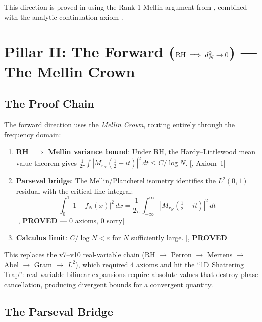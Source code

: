\documentclass[11pt,a4paper]{article}
\begin{document}
This direction is proved in  using
the Rank-1 Mellin argument from , combined with the
analytic continuation axiom .

\section{Pillar II: The Forward ($\mathrm{RH} \implies d_N^2 \to 0$) --- The Mellin Crown}

\subsection{The Proof Chain}

The forward direction uses the \emph{Mellin Crown}, routing entirely through
the frequency domain:

\begin{enumerate}
  \item \textbf{RH $\implies$ Mellin variance bound}: Under RH, the
    Hardy--Littlewood mean value theorem gives
    $\frac{1}{2\pi}\int |M_{r_N}(\frac{1}{2}+it)|^2\,dt \le C/\log N$.
    [, Axiom~1]

  \item \textbf{Parseval bridge}: The Mellin/Plancherel isometry identifies
    the $L^2(0,1)$ residual with the critical-line integral:
    \[
      \int_0^1 |1 - f_N(x)|^2\,dx
      = \frac{1}{2\pi} \int_{-\infty}^{\infty}
        |M_{r_N}(\tfrac{1}{2}+it)|^2\,dt
    \]
    [, \textbf{PROVED} --- 0 axioms, 0 sorry]

  \item \textbf{Calculus limit}: $C/\log N < \varepsilon$ for $N$
    sufficiently large.
    [, \textbf{PROVED}]
\end{enumerate}

\noindent This replaces the v7--v10 real-variable chain
(RH $\to$ Perron $\to$ Mertens $\to$ Abel $\to$ Gram $\to$ $L^2$),
which required 4 axioms and hit the ``1D Shattering Trap'':
real-variable bilinear expansions require absolute values that destroy
phase cancellation, producing divergent bounds for a convergent quantity.

\subsection{The Parseval Bridge}
\end{document}
